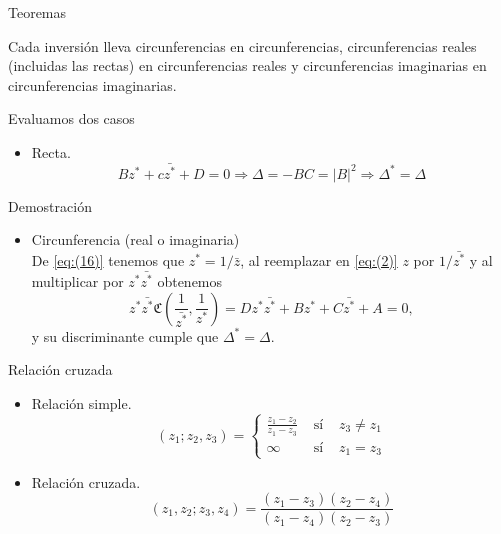 \documentclass{beamer}
\newenvironment{Teorema}[1]{
  \begin{tcolorbox}[colback=blockbackground,colframe=ritsumeikan,title=#1]
}{
  \end{tcolorbox}
}
\newenvironment{Demostracion}[1]{
  \begin{tcolorbox}[colback=blockbackground,colframe=dem,title=#1]
}{
  \end{tcolorbox}
}
\begin{document}
\begin{frame}{Teoremas}
    \begin{Teorema}{Teorema}
        Cada inversión lleva circunferencias en circunferencias, circunferencias reales (incluidas las rectas) en circunferencias reales y circunferencias imaginarias en circunferencias imaginarias.
    \end{Teorema}
    \begin{Demostracion}{Demostración}
        Evaluamos dos casos
        \begin{itemize}
            \item Recta.
            \begin{equation*}
                Bz^*+c\bar{z^*}+D=0 \Rightarrow \Delta=-BC=|B|^2 \Rightarrow \Delta^*=\Delta
            \end{equation*}
        \end{itemize}
    \end{Demostracion}
\end{frame}

\begin{frame}{Demostración}
    \begin{Demostracion}{Demostración}
        \begin{itemize}
            \item Circunferencia (real o imaginaria)\\
            De \eqref{eq:(16)} tenemos que $z^*=1/\bar{z}$, al reemplazar en \eqref{eq:(2)} $z$ por $1/\bar{z^*}$ y al multiplicar por $z^*\bar{z^*}$ obtenemos
            \begin{equation}
                z^*\bar{z^*}\mathfrak{C}\left(\frac{1}{\bar{z^*}},\frac{1}{z^*}\right)=Dz^*\bar{z^*}+Bz^*+C\bar{z^*}+A=0,
                \label{eq:(19)}
            \end{equation}
            y su discriminante cumple que $\Delta^*=\Delta$.
        \end{itemize}
    \end{Demostracion}
\end{frame}

\begin{frame}{Relación cruzada}
    \begin{itemize}
        \item Relación simple.
        \begin{equation}
            (z_1;z_2,z_3) = \left\{
            \begin{array}{lcc}
               \frac{z_1-z_2}{z_1-z_3}  & \text{ sí } & z_3 \neq z_1  \\
                 \infty & \text{ sí } & z_1=z_3
            \end{array}
            \right.
            \label{eq:(34)}
        \end{equation}
        \item Relación cruzada.
        \begin{equation}
            (z_1,z_2;z_3,z_4) = \frac{(z_1-z_3)(z_2-z_4)}{(z_1-z_4)(z_2-z_3)}
            \label{eq:(35)}
        \end{equation}
    \end{itemize}
\end{frame}
\end{document}

